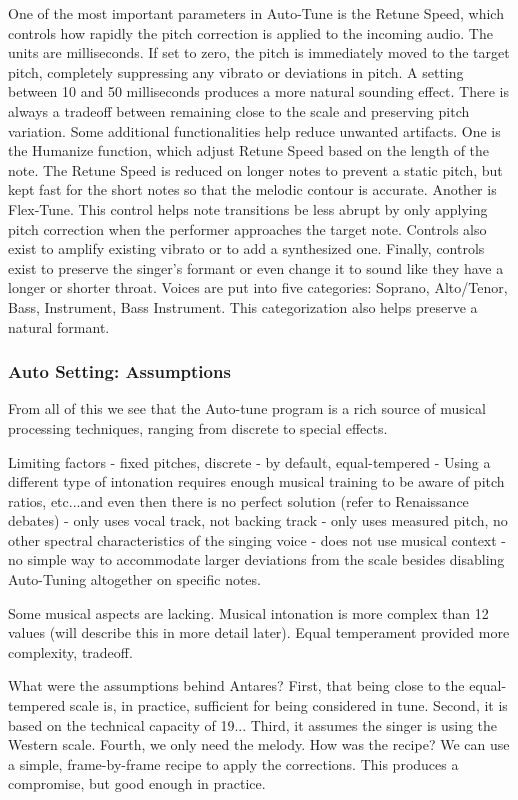 One of the most important parameters in Auto-Tune is the Retune Speed, which controls how rapidly the pitch correction is applied to the incoming audio. The units are milliseconds. If set to zero, the pitch is immediately moved to the target pitch, completely suppressing any vibrato or deviations in pitch. A setting between 10 and 50 milliseconds produces a more natural sounding effect. There is always a tradeoff between remaining close to the scale and preserving pitch variation. Some additional functionalities help reduce unwanted artifacts. One is the Humanize function, which adjust Retune Speed based on the length of the note. The Retune Speed is reduced on longer notes to prevent a static pitch, but kept fast for the short notes so that the melodic contour is accurate. Another is Flex-Tune. This control helps note transitions be less abrupt by only applying pitch correction when the performer approaches the target note. Controls also exist to amplify existing vibrato or to add a synthesized one. Finally, controls exist to preserve the singer's formant or even change it to sound like they have a longer or shorter throat. Voices are put into five categories: Soprano, Alto/Tenor, Bass, Instrument, Bass Instrument. This categorization also helps preserve a natural formant. 

\subsubsection{Auto Setting: Assumptions}
From all of this we see that the Auto-tune program is a rich source of musical processing techniques, ranging from discrete to special effects.

Limiting factors
- fixed pitches, discrete
- by default, equal-tempered
- Using a different type of intonation requires enough musical training to be aware of pitch ratios, etc...and even then there is no perfect solution (refer to Renaissance debates)
- only uses vocal track, not backing track
- only uses measured pitch, no other spectral characteristics of the singing voice
- does not use musical context
- no simple way to accommodate larger deviations from the scale besides disabling Auto-Tuning altogether on specific notes.

Some musical aspects are lacking. Musical intonation is more complex than 12 values (will describe this in more detail later). Equal temperament provided more complexity, tradeoff.

What were the assumptions behind Antares? First, that being close to the equal-tempered scale is, in practice, sufficient for being considered in tune. Second, it is based on the technical capacity of 19... Third, it assumes the singer is using the Western scale. Fourth, we only need the melody. How was the recipe? We can use a simple, frame-by-frame recipe to apply the corrections. This produces a compromise, but good enough in practice.

